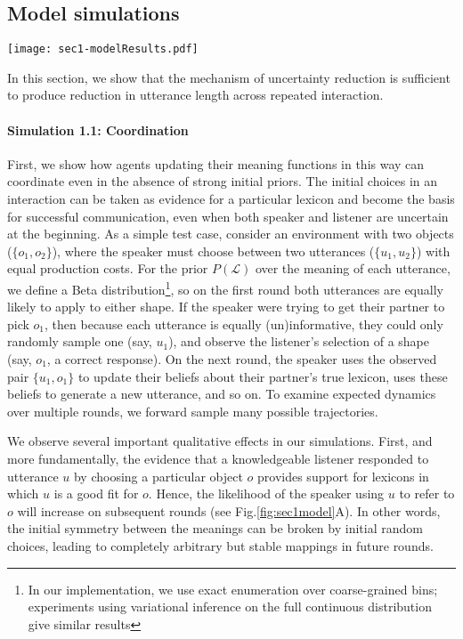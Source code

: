 \subsection{Model simulations}

\begin{figure*}
\centering
    \texttt{[image: sec1-modelResults.pdf]}
  \caption{Schematic of model}
  \label{fig:sec1model}
\end{figure*}


In this section, we show that the mechanism of uncertainty reduction is sufficient to produce reduction in utterance length across repeated interaction.

\paragraph{Simulation 1.1: Coordination}

First, we show how agents updating their meaning functions in this way can coordinate even in the absence of strong initial priors. 
The initial choices in an interaction can be taken as evidence for a particular lexicon and become the basis for successful communication, even when both speaker and listener are uncertain at the beginning.
As a simple test case, consider an environment with two objects ($\{o_1, o_2\}$), where the speaker must choose between two utterances ($\{u_1, u_2\}$) with equal production costs. 
For the prior $P(\mathcal{L})$ over the meaning of each utterance, we define a Beta distribution\footnote{In our implementation, we use exact enumeration over coarse-grained bins; experiments using variational inference on the full continuous distribution give similar results}, so on the first round both utterances are equally likely to apply to either shape. 
If the speaker were trying to get their partner to pick $o_1$, then because each utterance is equally (un)informative, they could only randomly sample one (say, $u_1$), and observe the listener's selection of a shape (say, $o_1$, a correct response). 
On the next round, the speaker uses the observed pair $\{u_1, o_1\}$ to update their beliefs about their partner's true lexicon, uses these beliefs to generate a new utterance, and so on. 
To examine expected dynamics over multiple rounds, we forward sample many possible trajectories.

We observe several important qualitative effects in our simulations. 
First, and more fundamentally, the evidence that a knowledgeable listener responded to utterance $u$ by choosing a particular object $o$ provides support for lexicons in which $u$ is a good fit for $o$. 
Hence, the likelihood of the speaker using $u$ to refer to $o$ will increase on subsequent rounds (see Fig.\ref{fig:sec1model}A). 
In other words, the initial symmetry between the meanings can be broken by initial random choices, leading to completely arbitrary but stable mappings in future rounds. 

